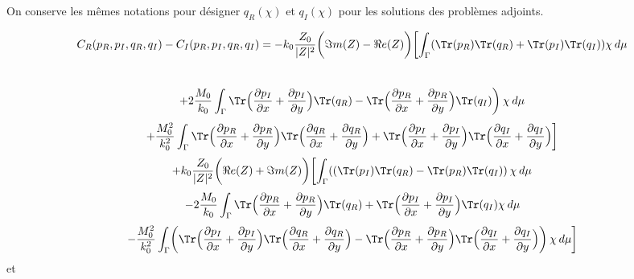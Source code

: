 On conserve les mêmes notations pour désigner $q_R(\chi)$ et $q_I(\chi)$ pour les solutions des problèmes adjoints. 

\[
C_R(p_R,p_I,q_R,q_I) - C_I(p_R,p_I,q_R,q_I) = -k_0\frac{Z_0}{|Z|^2} \biggl( \Im m(Z) - \Re e(Z) \biggl) \biggl[ \int_{\Gamma} ( \Tr(p_R) \Tr(q_R) + \Tr(p_I) \Tr(q_I))\chi \hspace{2pt} d\mu  \]\
\[
+ 2 \frac{M_0}{k_0} \int_{\Gamma}   \Tr \Bigl( \frac{\partial p_I}{\partial x}+\frac{\partial p_I}{\partial y} \Bigr) \Tr(q_R) - \Tr \Bigl( \frac{\partial p_R}{\partial x}+\frac{\partial p_R}{\partial y} \Bigr) \Tr(q_I) \biggl)\hspace{2pt} \chi \hspace{2pt} d\mu 
\]
\[
+ \frac{M_0^2}{k_0^2}\int_{\Gamma} \Tr \Bigl( \frac{\partial p_R}{\partial x}+\frac{\partial p_R}{\partial y}\Bigr)\Tr\Bigl( \frac{\partial q_R}{\partial x}+\frac{\partial q_R}{\partial y}\Bigr) + \Tr \Bigl( \frac{\partial p_I}{\partial x}+\frac{\partial p_I}{\partial y}\Bigr)\Tr\Bigl( \frac{\partial q_I}{\partial x}+\frac{\partial q_I}{\partial y}\Bigr) \biggl]  \]
\[
+ k_0\frac{Z_0}{|Z|^2}\biggl(\Re e(Z)+\Im m(Z)\biggl)\biggl[ \int_{\Gamma} ( ( \Tr(p_I) \Tr(q_R) - \Tr(p_R) \Tr(q_I)) \hspace{2pt} \chi \hspace{2pt} d\mu \]
\[
- 2\frac{M_0}{k_0} \int_{\Gamma} \Tr \Bigl( \frac{\partial p_R}{\partial x}+\frac{\partial p_R}{\partial y} \Bigr) \Tr(q_R) + \Tr \Bigl( \frac{\partial p_I}{\partial x}+\frac{\partial p_I}{\partial y} \Bigr) \Tr(q_I) \chi \hspace{2pt} d\mu 
\]
\[
- \frac{M_0^2}{k_0^2}\int_{\Gamma}
\biggl(\Tr \Bigl( \frac{\partial p_I}{\partial x}+\frac{\partial p_I}{\partial y}\Bigr)\Tr\Bigl( \frac{\partial q_R}{\partial x}+\frac{\partial q_R}{\partial y}\Bigr) - \Tr \Bigl( \frac{\partial p_R}{\partial x}+\frac{\partial p_R}{\partial y}\Bigr)\Tr\Bigl( \frac{\partial q_I}{\partial x}+\frac{\partial q_I}{\partial y}\Bigr) \biggl) \hspace{2pt} \chi  \hspace{2pt} d\mu \biggl]\]
et\\ \\


